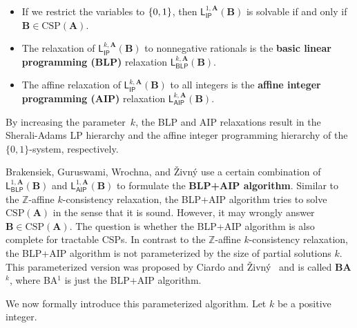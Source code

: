 \documentclass[a4paper,english, thm-restate]{lipics-v2021}
\newcommand{\ZZ}{\mathbb{Z}}
\newcommand{\defining}[1]{\textbf{#1}}
\DeclarePairedDelimiter\set{\lbrace}{\rbrace}
\newcommand{\StructA}{\mathbf{A}}
\newcommand{\StructB}{\mathbf{B}}
\newcommand{\CSP}[1]{\mathrm{CSP}(#1)}
\newcommand{\leqs}{\mathsf{L}}
\newcommand{\ipk}[3]{\leqs^{#1,#2}_{\mathsf{IP}} (#3)}
\newcommand{\blk}[3]{\leqs^{#1,#2}_{\mathsf{BLP}} (#3)}
\newcommand{\aipk}[3]{\leqs^{#1,#2}_{\mathsf{AIP}} (#3)}
\begin{document}
	\begin{itemize}
		\item If we restrict the variables to $\set{0,1}$, then
		$\ipk{1}{\StructA}{\StructB}$ is solvable if and only if
		$\StructB \in \CSP{\StructA}$.
		\item The relaxation of $\ipk{k}{\StructA}{\StructB}$ to nonnegative rationals is the \defining{basic linear programming (BLP)} relaxation $\blk{k}{\StructA}{\StructB}$.
		\item The affine relaxation of $\ipk{k}{\StructA}{\StructB}$ to all integers is the \defining{affine integer programming (AIP)} relaxation $\aipk{k}{\StructA}{\StructB}$.
	\end{itemize}
	By increasing the parameter~$k$, 
	the BLP and AIP relaxations result in the Sherali-Adams LP hierarchy and
	the affine integer programming hierarchy of the $\{0,1\}$-system, respectively.
	
	Brakensiek, Guruswami, Wrochna, and Živný \cite{BrakensiekGWZ2020} use a certain combination of $\blk{1}{\StructA}{\StructB}$ and $\aipk{1}{\StructA}{\StructB}$
	to formulate the \defining{BLP+AIP algorithm}.
	Similar to the $\ZZ$-affine $k$-consistency relaxation,
	the BLP+AIP algorithm tries to solve $\CSP{\StructA}$
	in the sense that it is sound.
	However, it may wrongly answer $\StructB \in \CSP{\StructA}$.
	The question is whether the BLP+AIP algorithm is also complete for tractable CSPs.
	In contrast to the $\ZZ$-affine $k$-consistency relaxation,
	the BLP+AIP algorithm is not parameterized by the size of partial solutions $k$.
	This parameterized version was proposed by Ciardo and Živný~\cite{CiardoZivny2023Tensors, CiardoZivny2023BAk}
	and is called \defining{BA$^k$}, where BA$^1$ is just the BLP+AIP algorithm.
	
	We now formally introduce this parameterized algorithm.
	Let $k$ be a positive integer.
	
\end{document}
